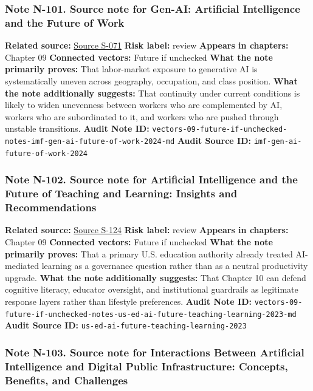 \documentclass[
  american,
  11pt,
  letterpaper,
]{article}
\begin{document}
\subsubsection{Note N-101. Source note for Gen-AI: Artificial
Intelligence and the Future of
Work}\label{note-n-101-vectors-09-future-if-unchecked-notes-imf-gen-ai-future-of-work-2024-md}

\textbf{Related source:}
\hyperref[source-s-071-gen-ai-artificial-intelligence-and-the-future-of-work]{Source
S-071} \textbf{Risk label:} review \textbf{Appears in chapters:} Chapter
09 \textbf{Connected vectors:} Future if unchecked \textbf{What the note
primarily proves:} That labor-market exposure to generative AI is
systematically uneven across geography, occupation, and class position.
\textbf{What the note additionally suggests:} That continuity under
current conditions is likely to widen unevenness between workers who are
complemented by AI, workers who are subordinated to it, and workers who
are pushed through unstable transitions. \textbf{Audit Note ID:}
\texttt{vectors-09-future-if-unchecked-notes-imf-gen-ai-future-of-work-2024-md}
\textbf{Audit Source ID:} \texttt{imf-gen-ai-future-of-work-2024}

\subsubsection{Note N-102. Source note for Artificial Intelligence and
the Future of Teaching and Learning: Insights and
Recommendations}\label{note-n-102-vectors-09-future-if-unchecked-notes-us-ed-ai-future-teaching-learning-2023-md}

\textbf{Related source:}
\hyperref[source-s-124-artificial-intelligence-and-the-future-of-teaching-and-learning-insights-and-recommendations]{Source
S-124} \textbf{Risk label:} review \textbf{Appears in chapters:} Chapter
09 \textbf{Connected vectors:} Future if unchecked \textbf{What the note
primarily proves:} That a primary U.S. education authority already
treated AI-mediated learning as a governance question rather than as a
neutral productivity upgrade. \textbf{What the note additionally
suggests:} That Chapter 10 can defend cognitive literacy, educator
oversight, and institutional guardrails as legitimate response layers
rather than lifestyle preferences. \textbf{Audit Note ID:}
\texttt{vectors-09-future-if-unchecked-notes-us-ed-ai-future-teaching-learning-2023-md}
\textbf{Audit Source ID:}
\texttt{us-ed-ai-future-teaching-learning-2023}

\subsubsection{Note N-103. Source note for Interactions Between
Artificial Intelligence and Digital Public Infrastructure: Concepts,
Benefits, and
Challenges}\label{note-n-103-vectors-10-counterstrategy-response-agenda-notes-ai-digital-public-infrastructure-2024-md}
\end{document}
